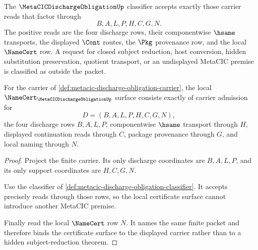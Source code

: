 \begin{definition}
\label{def:metacic-discharge-obligation-classifier}
The $\MetaCICDischargeObligationUp$ classifier accepts exactly those carrier reads that factor through
$$
B,A,L,P,H,C,G,N.
$$
The positive reads are the four discharge rows, their componentwise $\hsame$ transports, the displayed $\Cont$ routes, the $\Pkg$ provenance row, and the local $\NameCert$ row. A request for closed subject reduction, host conversion, hidden substitution preservation, quotient transport, or an undisplayed MetaCIC premise is classified as outside the packet.
\end{definition}

\begin{theorem}
\label{thm:metacic-discharge-obligation-certificate-surface}
For the carrier of \autoref{def:metacic-discharge-obligation-carrier}, the local $\NameCert_{\MetaCICDischargeObligationUp}$ surface consists exactly of carrier admission for
$$
D=(B,A,L,P,H,C,G,N),
$$
the four discharge rows $B,A,L,P$, componentwise $\hsame$ transport through $H$, displayed continuation reads through $C$, package provenance through $G$, and local naming through $N$.
\end{theorem}
\begin{proof}
Project the finite carrier. Its only discharge coordinates are $B,A,L,P$, and its only support coordinates are $H,C,G,N$.

Use the classifier of \autoref{def:metacic-discharge-obligation-classifier}. It accepts precisely reads through those rows, so the local certificate surface cannot introduce another MetaCIC premise.

Finally read the local $\NameCert$ row $N$. It names the same finite packet and therefore binds the certificate surface to the displayed carrier rather than to a hidden subject-reduction theorem.
\end{proof}

